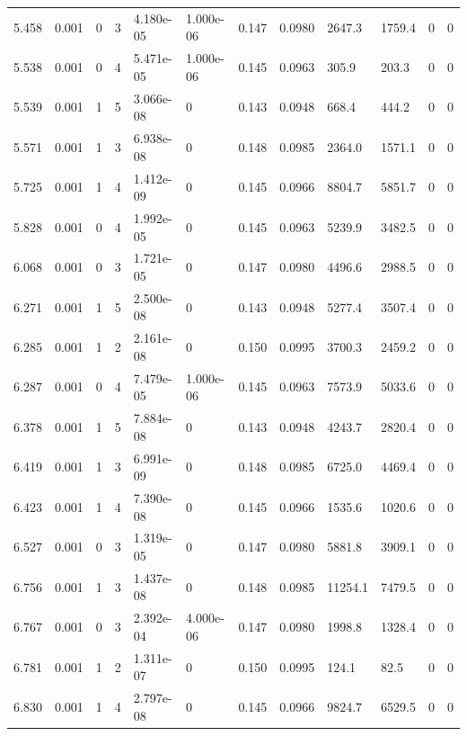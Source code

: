 \documentclass[preview]{standalone}
\begin{document}
{{{\begin{tabular}{L{1.2cm}C{1.2cm} C{0.3cm}C{0.5cm} C{1.4cm}C{1.4cm} C{1.4cm}C{1.4cm} C{1.6cm}C{1.6cm} C{1.6cm}C{1.6cm}}
  5.458  &  0.001  & 0     &  3 &  4.180e-05  & 1.000e-06  &  0.147&   0.0980& 2647.3 & 1759.4   &  0 & 0  \\ 
  5.538  &  0.001  & 0     &  4 &  5.471e-05  & 1.000e-06  &  0.145&   0.0963& 305.9 & 203.3   &  0 & 0  \\ 
  5.539  &  0.001  & 1     &  5 &  3.066e-08  & 0  &  0.143&   0.0948& 668.4 & 444.2   &  0 & 0  \\ 
  5.571  &  0.001  & 1     &  3 &  6.938e-08  & 0  &  0.148&   0.0985& 2364.0 & 1571.1   &  0 & 0  \\ 
  5.725  &  0.001  & 1     &  4 &  1.412e-09  & 0  &  0.145&   0.0966& 8804.7 & 5851.7   &  0 & 0  \\ 
  5.828  &  0.001  & 0     &  4 &  1.992e-05  & 0  &  0.145&   0.0963& 5239.9 & 3482.5   &  0 & 0  \\ 
  6.068  &  0.001  & 0     &  3 &  1.721e-05  & 0  &  0.147&   0.0980& 4496.6 & 2988.5   &  0 & 0  \\ 
  6.271  &  0.001  & 1     &  5 &  2.500e-08  & 0  &  0.143&   0.0948& 5277.4 & 3507.4   &  0 & 0  \\ 
  6.285  &  0.001  & 1     &  2 &  2.161e-08  & 0  &  0.150&   0.0995& 3700.3 & 2459.2   &  0 & 0  \\ 
  6.287  &  0.001  & 0     &  4 &  7.479e-05  & 1.000e-06  &  0.145&   0.0963& 7573.9 & 5033.6   &  0 & 0  \\ 
  6.378  &  0.001  & 1     &  5 &  7.884e-08  & 0  &  0.143&   0.0948& 4243.7 & 2820.4   &  0 & 0  \\ 
  6.419  &  0.001  & 1     &  3 &  6.991e-09  & 0  &  0.148&   0.0985& 6725.0 & 4469.4   &  0 & 0  \\ 
  6.423  &  0.001  & 1     &  4 &  7.390e-08  & 0  &  0.145&   0.0966& 1535.6 & 1020.6   &  0 & 0  \\ 
  6.527  &  0.001  & 0     &  3 &  1.319e-05  & 0  &  0.147&   0.0980& 5881.8 & 3909.1   &  0 & 0  \\ 
  6.756  &  0.001  & 1     &  3 &  1.437e-08  & 0  &  0.148&   0.0985& 11254.1 & 7479.5   &  0 & 0  \\ 
  6.767  &  0.001  & 0     &  3 &  2.392e-04  & 4.000e-06  &  0.147&   0.0980& 1998.8 & 1328.4   &  0 & 0  \\ 
  6.781  &  0.001  & 1     &  2 &  1.311e-07  & 0  &  0.150&   0.0995& 124.1 & 82.5   &  0 & 0  \\ 
  6.830  &  0.001  & 1     &  4 &  2.797e-08  & 0  &  0.145&   0.0966& 9824.7 & 6529.5   &  0 & 0  \\ 

\end{tabular}}}}
\end{document}
